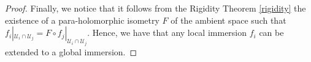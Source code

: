 \documentclass[10pt,a4paper]{amsart}
\begin{document}
\begin{proof}
Finally, we notice that it follows from the Rigidity Theorem \ref{rigidity} the existence of a para-holomorphic isometry  $F$ of the ambient space such that  $f_i|_{\mathcal{U}_i\cap\mathcal{U}_j }= F\circ f_j|_{\mathcal{U}_i\cap\mathcal{U}_j }$. Hence, we have that any local immersion $f_i$ can be extended to a global immersion.
\end{proof}
\end{document}
